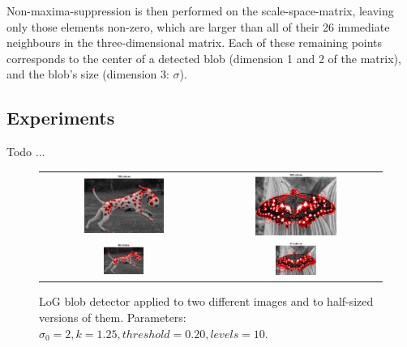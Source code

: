 Non-maxima-suppression is then performed on the scale-space-matrix, leaving only those elements non-zero, which are larger than all of their 26 immediate neighbours in the three-dimensional matrix. Each of these remaining points corresponds to the center of a detected blob (dimension 1 and 2 of the matrix), and the blob's size (dimension 3: $\sigma$).

\subsection{Experiments}

Todo ...

\begin{figure}[h]
	\centering
	\begin{tabular}{cc}
		\includegraphics[width=0.5\textwidth]{figures/a3_dalmation_k020_full.png} &
		\includegraphics[width=0.5\textwidth]{figures/a3_butterfly_k020.png} \\
		\includegraphics[width=0.25\textwidth]{figures/a3_dalmation_k020_half.png} &
		\includegraphics[width=0.25\textwidth]{figures/a3_butterfly_k020_small.png} \\
	\end{tabular}
	\caption{LoG blob detector applied to two different images and to half-sized versions of them. Parameters: $\sigma_0=2, k=1.25, threshold=0.20, levels=10$.}
	\label{fig:a3:thresholds}
\end{figure}

